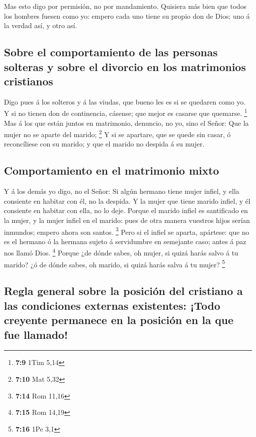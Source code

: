  Mas esto digo por permisión, no por mandamiento.
 Quisiera más bien que todos los hombres fuesen como yo:
empero cada uno tiene su propio don de Dios; uno á la verdad así, y otro
así.

\hypertarget{sobre-el-comportamiento-de-las-personas-solteras-y-sobre-el-divorcio-en-los-matrimonios-cristianos}{%
\subsection{Sobre el comportamiento de las personas solteras y sobre el
divorcio en los matrimonios
cristianos}\label{sobre-el-comportamiento-de-las-personas-solteras-y-sobre-el-divorcio-en-los-matrimonios-cristianos}}

 Digo pues á los solteros y á las viudas, que bueno les es
si se quedaren como yo.  Y si no tienen don de
continencia, cásense; que mejor es casarse que quemarse. \footnote{\textbf{7:9}
  1Tim 5,14}  Mas á los que están juntos en matrimonio,
denuncio, no yo, sino el Señor: Que la mujer no se aparte del marido;
\footnote{\textbf{7:10} Mat 5,32}  Y si se apartare, que
se quede sin casar, ó reconcíliese con su marido; y que el marido no
despida á su mujer.

\hypertarget{comportamiento-en-el-matrimonio-mixto}{%
\subsection{Comportamiento en el matrimonio
mixto}\label{comportamiento-en-el-matrimonio-mixto}}

 Y á los demás yo digo, no el Señor: Si algún hermano
tiene mujer infiel, y ella consiente en habitar con él, no la despida.
 Y la mujer que tiene marido infiel, y él consiente en
habitar con ella, no lo deje.  Porque el marido infiel es
santificado en la mujer, y la mujer infiel en el marido: pues de otra
manera vuestros hijos serían inmundos; empero ahora son santos.
\footnote{\textbf{7:14} Rom 11,16}  Pero si el infiel se
aparta, apártese: que no es el hermano ó la hermana sujeto á servidumbre
en semejante caso; antes á paz nos llamó Dios. \footnote{\textbf{7:15}
  Rom 14,19}  Porque ¿de dónde sabes, oh mujer, si quizá
harás salvo á tu marido? ¿ó de dónde sabes, oh marido, si quizá harás
salva á tu mujer? \footnote{\textbf{7:16} 1Pe 3,1}

\hypertarget{regla-general-sobre-la-posiciuxf3n-del-cristiano-a-las-condiciones-externas-existentes-todo-creyente-permanece-en-la-posiciuxf3n-en-la-que-fue-llamado}{%
\subsection{Regla general sobre la posición del cristiano a las
condiciones externas existentes: ¡Todo creyente permanece en la posición
en la que fue
llamado!}\label{regla-general-sobre-la-posiciuxf3n-del-cristiano-a-las-condiciones-externas-existentes-todo-creyente-permanece-en-la-posiciuxf3n-en-la-que-fue-llamado}}

